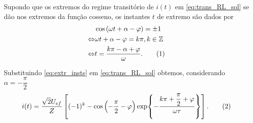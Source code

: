\documentclass[a4paper, titlepage, portuguese]{article}
\newcommand{\eq}{\Leftrightarrow} %
\newcommand\numberthis{\addtocounter{equation}{1}\tag{\theequation}}
\begin{document}
	\subsubsection{}
	\par
	Supondo que os extremos do regime transitório de $i(t)$ em \eqref{eq:trans_RL_sol} se dão nos extremos da função cosseno, os instantes $t$ de extremo são dados por
	\begin{align*}
		&\cos\left(\omega t + \alpha - \varphi\right) = \pm 1 \\ \eq
		&\omega t + \alpha - \varphi = k\pi, k \in \mathbb{Z} \\ \eq
		&t = \dfrac{k\pi - \alpha + \varphi}{\omega}. \numberthis \label{eq:extr_insts}
	\end{align*}
	\par
	Substituindo \eqref{eq:extr_insts} em \eqref{eq:trans_RL_sol} obtemos, considerando $\alpha = -\dfrac{\pi}{2}$
	\begin{align*}
		i(t) = \dfrac{\sqrt{2}U_{ef}}{Z} \left[(-1)^k - \cos\left(-\dfrac{\pi}{2} - \varphi\right)\exp{-\dfrac{k\pi + \dfrac{\pi}{2} + \varphi}{\omega\tau}}\right].\numberthis \label{eq:extr}
	\end{align*}

\end{document}
